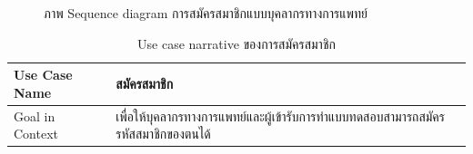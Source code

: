 \documentclass[12pt,oneside,openright,a4paper]{cpe-thai-project}
\begin{document}
\begin{itemize}
\begin{figure}[!ht]
         \end{figure}
         \newpage
         \begin{figure}[!ht]\centering
          \setlength{\fboxrule}{0.2mm} %
          \setlength{\fboxsep}{1cm}
          \caption{ภาพ Sequence diagram การสมัครสมาชิกแบบบุคลากรทางการแพทย์}\label{fig:activity7}
         \end{figure}
         \newpage
         \begin{table}[!h]\centering
          \caption{Use case narrative ของการสมัครสมาชิก}\label{tbl:register}
          \begin{tabular}{|p{3cm}|p{12cm}|} \hline
          Use Case Name & สมัครสมาชิก \\ \hline
          Goal in Context & เพื่อให้บุคลากรทางการแพทย์และผู้เข้ารับการทำแบบทดสอบสามารถสมัครรหัสสมาชิกของตนได้ \\ \hline

\end{tabular}
\end{table}
\end{itemize}
\end{document}
